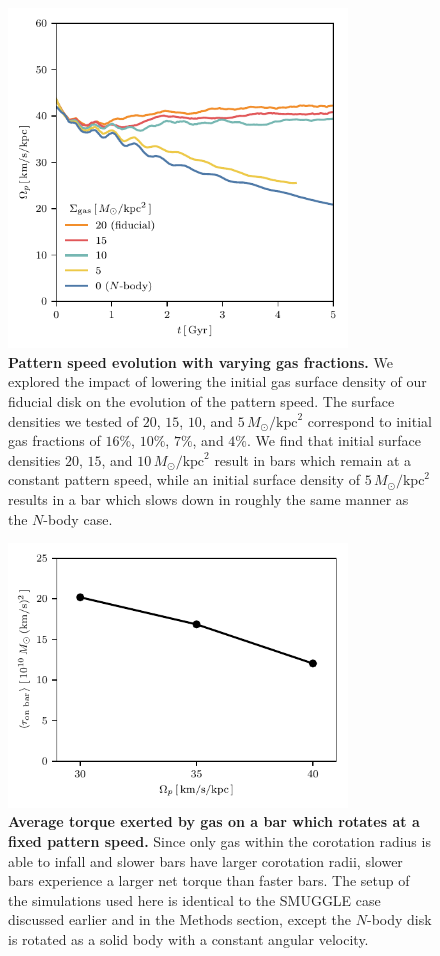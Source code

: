 \documentclass{natureprintstyle}
\newcommand{\Nbody}{$N$-body}
\newcommand{\Msun}{\ensuremath{M_{\odot}}}
\begin{document}
\begin{figure}[t!]%
\centering
\includegraphics[width=9cm]{fig/fig-fgas.pdf}
\caption{\textbf{Pattern speed evolution with varying gas fractions.} We
explored the impact of lowering the initial gas surface density of our
fiducial disk on the evolution of the pattern speed. The surface densities we
tested of $20$, $15$, $10$, and $5\,\Msun/\textrm{kpc}^2$ correspond to
initial gas fractions of $16\%$, $10\%$, $7\%$, and $4\%$. We find that
initial surface densities $20$, $15$, and $10\,\Msun/\textrm{kpc}^2$ result in
bars which remain at a constant pattern speed, while an initial surface
density of $5\,\Msun/\textrm{kpc}^2$ results in a bar which slows down in
roughly the same manner as the \Nbody{} case. }
\label{fig:fgas}
\end{figure}

\begin{figure}[h!]
\centering
\includegraphics[width=9cm]{fig/fig4.pdf}
\caption{\textbf{Average torque exerted by gas on a bar which rotates at a
fixed pattern speed.} Since only gas within the corotation radius is able to
infall and slower bars have larger corotation radii, slower bars experience a
larger net torque than faster bars. The setup of the simulations used here is
identical to the SMUGGLE case discussed earlier and in the Methods section,
except the \Nbody{} disk is rotated as a solid body with a constant angular
velocity.}\label{fig:equil}
\end{figure}
\end{document}
